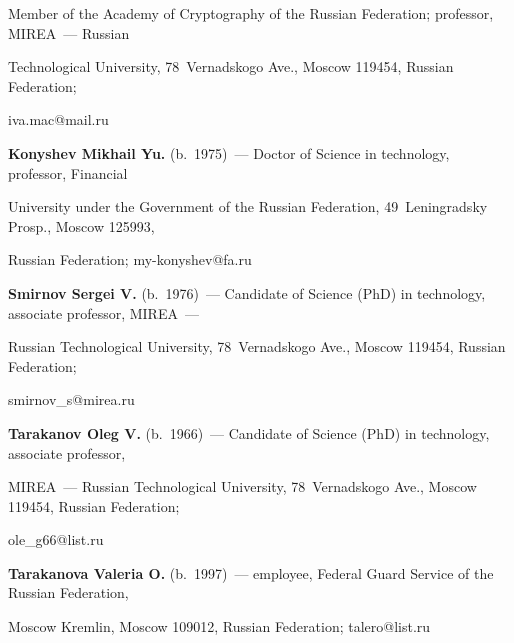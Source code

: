 Member of the Academy of Cryptography of the Russian Federation; professor, MIREA~--- Russian 

Technological University, 78~Vernadskogo Ave., Moscow 119454, Russian Federation; 

\mbox{iva.mac@mail.ru}



\vspace*{3pt}



\noindent

\textbf{Konyshev Mikhail Yu.} (b.\ 1975)~--- Doctor of Science in technology, professor, Financial 

University under the Government of the Russian Federation, 49~Leningradsky Prosp., Moscow 125993, 

Russian Federation; \mbox{my-konyshev@fa.ru}



\vspace*{3pt}



\noindent

\textbf{Smirnov Sergei V.} (b.\ 1976)~--- Candidate of Science (PhD) in technology, associate professor, MIREA~--- 

Russian Technological University, 78~Vernadskogo Ave., Moscow 119454, Russian Federation; 

\mbox{smirnov\_s@mirea.ru}



\noindent

\textbf{Tarakanov Oleg V.} (b.\ 1966)~--- Candidate of Science (PhD) in technology, associate professor, 

MIREA~--- Russian Technological University, 78~Vernadskogo Ave., Moscow 119454, Russian Federation;


\mbox{ole\_g66@list.ru}



\vspace*{3pt}



\noindent

\textbf{Tarakanova Valeria O.} (b.\ 1997)~--- employee, Federal Guard Service of the Russian Federation, 

Moscow Kremlin, Moscow 109012, Russian Federation; \mbox{talero@list.ru}



